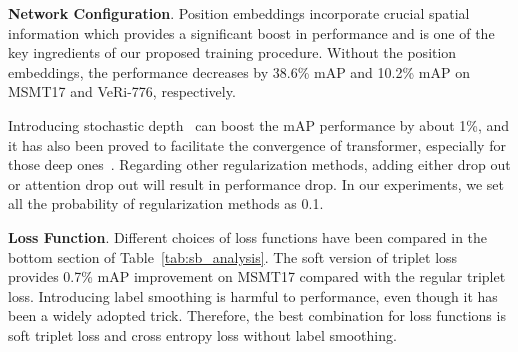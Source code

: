 \documentclass[10pt,twocolumn,letterpaper]{article}
\begin{document}
\textbf{Network Configuration}.
Position embeddings incorporate crucial spatial information which provides a significant boost in performance and is one of the key ingredients of our proposed training procedure. Without the position embeddings, the performance decreases by 38.6\% mAP and 10.2\% mAP on MSMT17 and VeRi-776, respectively.

Introducing  stochastic depth~\cite{stoc_depth} can boost the mAP performance by about 1\%, and it has also been proved to facilitate the convergence of transformer, especially for those deep ones~\cite{stoc_depth_1,stoc_depth_2}. 
Regarding other regularization methods, adding either drop out or attention drop out will result in performance drop. In our experiments, we set all the probability of regularization methods as 0.1.


\textbf{Loss Function}.
Different choices of loss functions have been compared in the bottom section of Table~\ref{tab:sb_analysis}. The soft version of triplet loss provides 0.7\% mAP improvement on MSMT17 compared with the regular triplet loss. Introducing label smoothing is harmful to performance, even though it has been a widely adopted trick. Therefore, the best combination for loss functions is soft triplet loss and cross entropy loss without label smoothing. 
\end{document}

